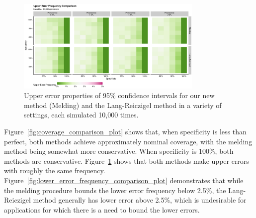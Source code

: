 \documentclass[AMA,STIX1COL]{WileyNJD-v2}
\begin{document}
\begin{figure}
    \centering
    \includegraphics[width=0.8\textwidth]{figures/simple_upper_error_frequency_comparison_plot.pdf}
    \caption{Upper error properties of 95\% confidence intervals for our new method (Melding) and the Lang-Reiczigel method in a variety of settings, each simulated 10,000 times.}
    \label{fig:upper_error_frequency_comparison_plot}
\end{figure}

Figure~\ref{fig:coverage_comparison_plot} shows that, when specificity is less than perfect, both methods achieve approximately nominal coverage, with the melding method being somewhat more conservative.
When specificity is 100\%, both methods are conservative.
Figure~\ref{fig:upper_error_frequency_comparison_plot} shows that both methods make upper errors with roughly the same frequency.
Figure~\ref{fig:lower_error_frequency_comparison_plot} demonstrates that while the melding procedure bounds the lower error frequency below 2.5\%, the Lang-Reiczigel method generally has lower error above 2.5\%, which is undesirable for applications for which there is a need to bound the lower errors.
\end{document}
